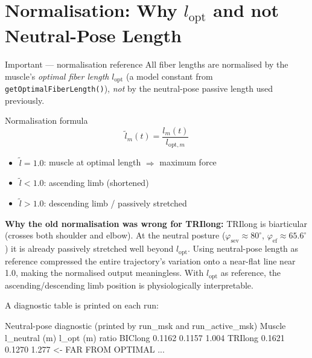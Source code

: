 \documentclass[11pt,a4paper]{article}
\begin{document}
\section{Normalisation: Why $l_\text{opt}$ and not Neutral-Pose Length}

\begin{notebox}[PipeRed]{Important — normalisation reference}
All fiber lengths are normalised by the muscle's \emph{optimal fiber length}
$l_\text{opt}$ (a model constant from \texttt{getOptimalFiberLength()}),
\emph{not} by the neutral-pose passive length used previously.
\end{notebox}

\begin{eqbox}{Normalisation formula}
\begin{equation}
\tilde{l}_m(t) = \frac{l_m(t)}{l_{\text{opt},m}}
\end{equation}
\begin{itemize}\itemsep0pt
  \item $\tilde{l} = 1.0$: muscle at optimal length $\Rightarrow$ maximum force
  \item $\tilde{l} < 1.0$: ascending limb (shortened)
  \item $\tilde{l} > 1.0$: descending limb / passively stretched
\end{itemize}
\end{eqbox}

\textbf{Why the old normalisation was wrong for TRIlong:}
TRIlong is biarticular (crosses both shoulder and elbow).
At the neutral posture ($\varphi_\text{sev} \approx 80^\circ$,
$\varphi_\text{ef} \approx 65.6^\circ$) it is already passively
stretched well beyond $l_\text{opt}$.  Using neutral-pose length as
reference compressed the entire trajectory's variation onto a near-flat
line near 1.0, making the normalised output meaningless.
With $l_\text{opt}$ as reference, the ascending/descending limb position
is physiologically interpretable.

A diagnostic table is printed on each run:

\begin{codebox}{Neutral-pose diagnostic (printed by run\_msk and run\_active\_msk)}
  Muscle        l_neutral (m)  l_opt (m)  ratio
  BIClong          0.1162       0.1157     1.004
  TRIlong          0.1621       0.1270     1.277  <- FAR FROM OPTIMAL
  ...
\end{codebox}
\end{document}
